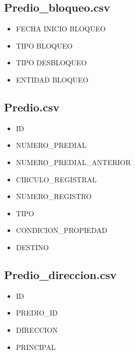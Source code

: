\documentclass[letterpaper,10pt,spanish]{sphinxmanual}
\begin{document}
\subsection{Predio\_bloqueo.csv}
\label{\detokenize{ETL_SNC/Structure:predio-bloqueo-csv}}\begin{itemize}
\item {} 
FECHA INICIO BLOQUEO

\item {} 
TIPO BLOQUEO

\item {} 
TIPO DESBLOQUEO

\item {} 
ENTIDAD BLOQUEO

\end{itemize}


\subsection{Predio.csv}
\label{\detokenize{ETL_SNC/Structure:predio-csv}}\begin{itemize}
\item {} 
ID

\item {} 
NUMERO\_PREDIAL

\item {} 
NUMERO\_PREDIAL\_ANTERIOR

\item {} 
CIRCULO\_REGISTRAL

\item {} 
NUMERO\_REGISTRO

\item {} 
TIPO

\item {} 
CONDICION\_PROPIEDAD

\item {} 
DESTINO

\end{itemize}


\subsection{Predio\_direccion.csv}
\label{\detokenize{ETL_SNC/Structure:predio-direccion-csv}}\begin{itemize}
\item {} 
ID

\item {} 
PREDIO\_ID

\item {} 
DIRECCION

\item {} 
PRINCIPAL

\end{itemize}
\end{document}
